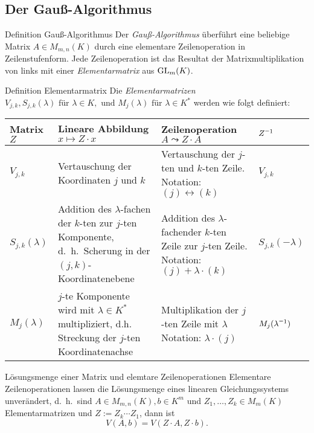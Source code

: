 \documentclass[main.tex]{subfiles}
\begin{document}
\subsection*{Der Gauß-Algorithmus}
\begin{karte}{Definition Gauß-Algorithmus}
    Der \textit{Gauß-Algorithmus} überführt eine beliebige Matrix 
    \( A \in M_{m,n}(K) \) durch eine elementare Zeilenoperation 
    in Zeilenstufenform. Jede Zeilenoperation ist das Resultat der 
    Matrixmultiplikation von links mit einer \textit{Elementarmatrix} 
    aus \( \operatorname{GL}_m(K) \).
\end{karte}
\begin{karte}{Definition Elementarmatrix}
    Die \textit{Elementarmatrizen} \(V_{j,k}, S_{j,k}(\lambda) 
    \text{ für } \lambda \in K, \text{ und } M_j(\lambda) \text{ für }
    \lambda \in K^* \) werden wie folgt definiert:\\
    \begin{tabular}{p{1.75 cm}|p{4 cm}|p{4 cm}|p{1.5 cm}}
        Matrix \(Z\) & Lineare Abbildung\newline \(x \mapsto Z \cdot x\) & Zeilenoperation\newline \(A\leadsto Z \cdot A\) & \(\inverse{Z}\) \\ 
        \hline
        \(V_{j,k}\) & Vertauschung der Koordinaten \(j\) und \(k\) & Vertauschung der \(j\)-ten und \(k\)-ten Zeile. \newline Notation: \( (j) \leftrightarrow (k) \) & \(V_{j,k}\) \\
        \hline
        \(S_{j,k}(\lambda)\) & Addition des \(\lambda\)-fachen \newline der \(k\)-ten zur \(j\)-ten \newline Komponente, d.\ h.\ \newline Scherung in der \((j,k)\)-Koordinatenebene & Addition des \(\lambda\)-fachen\newline der \(k\)-ten Zeile zur \(j\)-ten Zeile. \newline Notation: \((j) + \lambda \cdot (k) \) & \(S_{j,k}(-\lambda)\) \\
        \hline
        \(M_j(\lambda)\) & \(j\)-te Komponente wird mit \( \lambda \in K^* \) multipliziert, d.h. Streckung der \(j\)-ten Koordinatenachse & Multiplikation der \(j\)-ten Zeile mit \(\lambda\) \newline Notation: \(\lambda \cdot (j) \) & \(M_j(\inverse{\lambda})\)
    \end{tabular}
\end{karte}
\begin{karte}{Lösungsmenge einer Matrix und elemtare Zeilenoperationen}
    Elementare Zeilenoperationen lassen die Lösungsmenge eines 
    linearen Gleichungssystems unverändert, d.\ h.\ sind 
    \( A \in M_{m,n}(K), b \in K^m \) und \( Z_1,\ldots, Z_k \in M_m(K) \)
    Elementarmatrizen und \( Z := Z_k \cdots Z_1 \), dann ist 
    \[ V(A,b) = V(Z \cdot A, Z \cdot b). \]
\end{karte}
\end{document}
